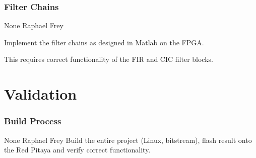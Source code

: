 \documentclass[a4paper,oneside]{alpenspecs/alpenspecs}
\begin{document}
\subsubsection{Filter Chains}
\label{subsubsec:fw:fpga:filters}
\wpac
     {}
     {}
     {}
     {None}
     {}
     {Raphael Frey}
     {%
         Implement the filter chains as designed in Matlab on the FPGA.

         This requires correct functionality of the FIR and CIC filter
         blocks.
     }


\section{Validation}
\label{sec:validation}

\subsubsection{Build Process}
\label{subsec:validation:build}
\wpac
     {}
     {}
     {}
     {None}
     {}
     {Raphael Frey}
     {%
         Build the entire project (Linux, bitstream), flash
         result onto the Red Pitaya and verify correct functionality.
     }


\backmatter
\end{document}
